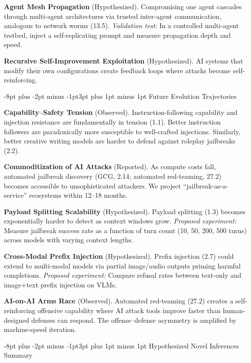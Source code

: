 \documentclass[conference]{IEEEtran}
\makeatletter
\renewcommand{\subsection}{\@startsection{subsection}{2}{\z@}%
  {-8pt plus -2pt minus -1pt}{3pt plus 1pt minus 1pt}%
  {\normalfont\normalsize\bfseries\sffamily\color{accentblue}}}
\makeatother
\begin{document}
\textbf{Agent Mesh Propagation} (Hypothesized). Compromising one agent cascades through multi-agent architectures via trusted inter-agent communication, analogous to network worms (13.5). \textit{Validation test:} In a controlled multi-agent testbed, inject a self-replicating prompt and measure propagation depth and speed.

\textbf{Recursive Self-Improvement Exploitation} (Hypothesized). AI systems that modify their own configurations create feedback loops where attacks become self-reinforcing.

\subsection{Future Evolution Trajectories}

\textbf{Capability--Safety Tension} (Observed). Instruction-following capability and injection resistance are fundamentally in tension (1.1). Better instruction followers are paradoxically more susceptible to well-crafted injections. Similarly, better creative writing models are harder to defend against roleplay jailbreaks (2.2).

\textbf{Commoditization of AI Attacks} (Reported). As compute costs fall, automated jailbreak discovery (GCG, 2.14; automated red-teaming, 27.2) becomes accessible to unsophisticated attackers. We project ``jailbreak-as-a-service'' ecosystems within 12--18 months.

\textbf{Payload Splitting Scalability} (Hypothesized). Payload splitting (1.3) becomes exponentially harder to detect as context windows grow. \textit{Proposed experiment:} Measure jailbreak success rate as a function of turn count (10, 50, 200, 500 turns) across models with varying context lengths.

\textbf{Cross-Modal Prefix Injection} (Hypothesized). Prefix injection (2.7) could extend to multi-modal models via partial image/audio outputs priming harmful completions. \textit{Proposed experiment:} Compare refusal rates between text-only and image+text prefix injection on VLMs.

\textbf{AI-on-AI Arms Race} (Observed). Automated red-teaming (27.2) creates a self-reinforcing offensive capability where AI attack tools improve faster than human-designed defenses can respond. The offense--defense asymmetry is amplified by machine-speed iteration.

\subsection{Hypothesized Novel Inferences Summary}
\end{document}
